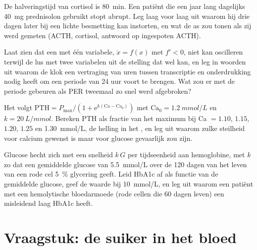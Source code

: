 \begin{exercise}[$\star\star$]\label{exo:b3:endocrinology:9}
De halveringstijd van cortisol is \qty{80}{min}. Een patiënt die een
jaar lang dagelijks \qty{40}{mg} prednisolon gebruikt stopt abrupt. Leg
laag voor laag uit waarom hij drie dagen later bij een lichte
besmetting kan instorten, en wat de as zou tonen als zij werd gemeten
(ACTH, cortisol, antwoord op ingespoten ACTH).
\end{exercise}

\begin{exercise}[$\star\star\star$]\label{exo:b3:endocrinology:10}
Laat zien dat een  met één variabele, $\dot x = f(x)$
met $f' < 0$, niet kan oscilleren terwijl de lus met twee
variabelen uit de stelling dat wel kan, en leg in woorden uit waarom de
klok een vertraging van uren tussen transcriptie en onderdrukking nodig
heeft om een periode van 24 uur voort te brengen. Wat zou er met de
periode gebeuren als PER tweemaal zo snel werd afgebroken?
\end{exercise}

\begin{exercise}[$\star\star\star$]\label{exo:b3:endocrinology:11}
Het  volgt $\text{PTH} = P_{\max}/(1 +
\mathrm{e}^{k(\text{Ca} - \text{Ca}_{0})})$ met $\text{Ca}_{0} =
\qty{1.2}{mmol/L}$ en $k = \qty{20}{L/mmol}$. Bereken PTH als fractie
van het maximum bij Ca $= 1.10$, $1.15$, $1.20$, $1.25$ en \qty{1.30}{mmol/L},
de helling in het , en leg uit waarom zulke steilheid voor
calcium gewenst is maar voor glucose gevaarlijk zou zijn.
\end{exercise}

\begin{exercise}[$\star\star\star$]\label{exo:b3:endocrinology:12}
Glucose hecht zich met een snelheid $k\,G$ per tijdseenheid aan
hemoglobine, met $k$ zo dat een gemiddelde glucose van \qty{5.5}{mmol/L}
over de 120 dagen van het leven van een rode cel \qty{5}{\%} glycering
geeft. Leid HbA1c af als functie van de gemiddelde glucose, geef de
waarde bij \qty{10}{mmol/L}, en leg uit waarom een patiënt met een
hemolytische bloedarmoede (rode cellen die 60 dagen leven) een
misleidend laag HbA1c heeft.
\end{exercise}

\section{Vraagstuk: de suiker in het bloed}

